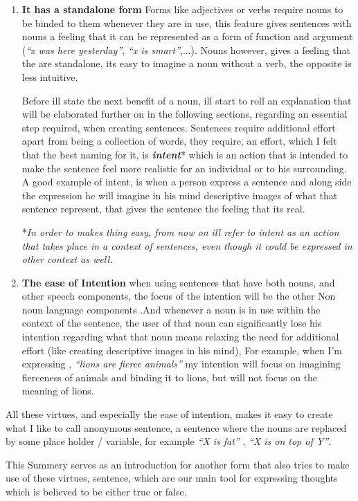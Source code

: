 \documentclass[10pt]{article}
\begin{document}
\begin{enumerate}
\item
\textbf{It has a standalone form}  Forms like adjectives or verbs require nouns to be binded to them whenever they are in use,  this feature gives sentences with nouns a feeling that it can be represented as a form of function and argument  (\textit{“x was here yesterday”}, \textit{“x is smart”},...). Nouns however, gives a feeling that the are standalone, its easy to imagine a noun without a verb, the opposite is less intuitive.

\par
Before ill state the next benefit of a noun, ill start to roll an explanation that will be elaborated further on in the following sections, regarding an essential step required, when creating sentences. Sentences require additional effort apart from being a collection of words, they require, an effort, which I felt that the best naming for it, is  \textbf{\textit{intent}}* which is an action that is intended to make the sentence feel more realistic for an individual or to his surrounding. A good example of intent, is when a person express a sentence and along side the expression he will imagine in his mind descriptive images of what that sentence represent, that gives the sentence the feeling that its real.

*\textit{In order to makes thing easy, from now on ill refer to intent as an action that takes place in a context of sentences, even though it could be expressed in other context as well.}


\item
\textbf{The ease of Intention}
when using sentences that have both nouns, and other speech components, the focus of the intention will be the other Non noun language components .And  whenever a noun is in use within the context of the sentence, the user of that noun can significantly lose his intention regarding what that noun means relaxing the need for additional effort (like  creating descriptive images in his mind),  For example, when I'm expressing , \textit{“lions are fierce animals”} my intention will focus on imagining fierceness of animals and binding it to lions, but will not focus on the meaning of lions.
\end{enumerate}

\par
All these virtues, and especially the ease of intention, makes it easy to create what I like to call anonymous sentence, a sentence where the nouns are replaced by some place holder / variable, for example \textit{“X is fat”} , \textit{“X is on top of Y”}.
\par
This Summery serves as an introduction for another form that also tries to make use of these virtues, sentence, which are our main tool for expressing thoughts which is believed to be either true or false.
\end{document}
